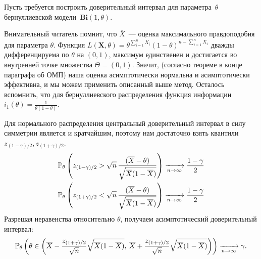 \begin{exmp}
    Пусть требуется построить доверительный интервал для параметра~$\theta$ бернуллиевской модели~$\mathbf{Bi}(1, \theta)$.
    
    Внимательный читатель помнит, что $\overline{X}$~--- оценка максимального правдоподобия для параметра $\theta$.
    Функция $L(\mathbf{X}, \theta) = \theta^{\sum\limits_{i=1}^{n} X_i} (1 - \theta)^{n - \sum\limits_{i=1}^{n} X_i}$ дважды дифференцируема по $\theta$ на $(0, 1)$, 
    максимум единственен и достигается во внутренней точке множества $\Theta = (0, 1)$.
    Значит, (согласно теореме в конце параграфа об ОМП) наша оценка асимптотически нормальна и асимптотически эффективна, и мы можем применить описанный выше метод.
    Осталось вспомнить, что для бернуллиевского распределения функция информации $i_1(\theta) = \frac{1}{\theta(1 - \theta)}$.
    
    Для нормального распределения центральный доверительный интервал в силу симметрии является и кратчайшим, 
    поэтому нам достаточно взять квантили $z_{(1 - \gamma)/2}, z_{(1 + \gamma)/2}$.
    \begin{gather*}
        \mathbb{P}_{\theta} \left( z_{(1 - \gamma)/2} > \sqrt{n} \, \frac{(\overline{X} - \theta)}{\sqrt{ \overline{X}(1 - \overline{X})}} \right) 
        \xrightarrow[n \to \infty]{} \frac{1 - \gamma}{2} \\
        \mathbb{P}_{\theta} \left( z_{(1 + \gamma)/2} < \sqrt{n} \, \frac{(\overline{X} - \theta)}{\sqrt{ \overline{X}(1 - \overline{X})}} \right) 
        \xrightarrow[n \to \infty]{} \frac{1 - \gamma}{2}
    \end{gather*}
    Разрешая неравенства относительно $\theta$, получаем асимптотический доверительный интервал:
    \begin{equation*}
        \mathbb{P}_{\theta} \left(\theta \in \left(\overline{X} - \frac{z_{(1 + \gamma)/2}}{\sqrt{n}} \sqrt{\overline{X}(1 - \overline{X})}, 
                                    \: \overline{X} + \frac{z_{(1 + \gamma)/2}}{\sqrt{n}} \sqrt{\overline{X}(1 - \overline{X})} \right) \right) 
        \xrightarrow[n \to \infty]{} 
        \gamma.
    \end{equation*}
\end{exmp}
